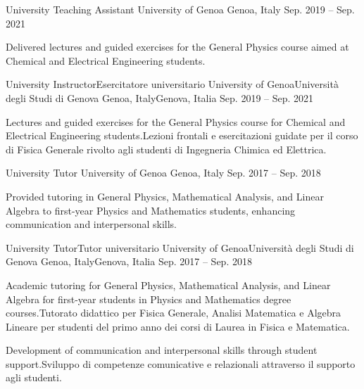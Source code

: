 \begin{cventries}

\ifenglish
\cventry
{University Teaching Assistant} %
{University of Genoa} %
{Genoa, Italy} %
{Sep. 2019 -- Sep. 2021} %
{ %
\begin{cvitems}
  \item {Delivered lectures and guided exercises for the General Physics course aimed at Chemical and Electrical Engineering students.}
\end{cvitems}
}
\else
\cventry
{\ifenglish University Instructor\else Esercitatore universitario\fi} %
{\ifenglish University of Genoa\else Università degli Studi di Genova\fi} %
{\ifenglish Genoa, Italy\else Genova, Italia\fi} %
{Sep. 2019 -- Sep. 2021} %
{ %
\begin{cvitems}
\item {\ifenglish Lectures and guided exercises for the General Physics course for Chemical and Electrical Engineering students.\else Lezioni frontali e esercitazioni guidate per il corso di Fisica Generale rivolto agli studenti di Ingegneria Chimica ed Elettrica.\fi}
\end{cvitems}
}
\fi


\ifenglish
\cventry
{University Tutor} %
{University of Genoa} %
{Genoa, Italy} %
{Sep. 2017 -- Sep. 2018} %
{ %
\begin{cvitems}
  \item {Provided tutoring in General Physics, Mathematical Analysis, and Linear Algebra to first-year Physics and Mathematics students, enhancing communication and interpersonal skills.}
\end{cvitems}
}
\else
\cventry
{\ifenglish University Tutor\else Tutor universitario\fi} %
{\ifenglish University of Genoa\else Università degli Studi di Genova\fi} %
{\ifenglish Genoa, Italy\else Genova, Italia\fi} %
{Sep. 2017 -- Sep. 2018} %
{ %
\begin{cvitems}
\item {\ifenglish Academic tutoring for General Physics, Mathematical Analysis, and Linear Algebra for first-year students in Physics and Mathematics degree courses.\else Tutorato didattico per Fisica Generale, Analisi Matematica e Algebra Lineare per studenti del primo anno dei corsi di Laurea in Fisica e Matematica.\fi}
\item {\ifenglish Development of communication and interpersonal skills through student support.\else Sviluppo di competenze comunicative e relazionali attraverso il supporto agli studenti.\fi}
\end{cvitems}
}
\fi


\end{cventries}
